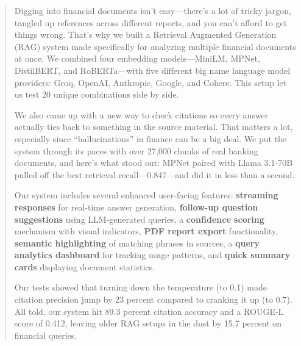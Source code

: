 \documentclass[runningheads]{llncs}
\begin{document}
\begin{abstract}
Digging into financial documents isn't easy---there's a lot of tricky jargon, tangled up references across different reports, and you can't afford to get things wrong. That's why we built a Retrieval Augmented Generation (RAG) system made specifically for analyzing multiple financial documents at once. We combined four embedding models---MiniLM, MPNet, DistilBERT, and RoBERTa---with five different big name language model providers: Groq, OpenAI, Anthropic, Google, and Cohere. This setup let us test 20 unique combinations side by side.

We also came up with a new way to check citations so every answer actually ties back to something in the source material. That matters a lot, especially since ``hallucinations'' in finance can be a big deal. We put the system through its paces with over 27,000 chunks of real banking documents, and here's what stood out: MPNet paired with Llama 3.1-70B pulled off the best retrieval recall---0.847---and did it in less than a second.

Our system includes several enhanced user-facing features: \textbf{streaming responses} for real-time answer generation, \textbf{follow-up question suggestions} using LLM-generated queries, a \textbf{confidence scoring} mechanism with visual indicators, \textbf{PDF report export} functionality, \textbf{semantic highlighting} of matching phrases in sources, a \textbf{query analytics dashboard} for tracking usage patterns, and \textbf{quick summary cards} displaying document statistics.

Our tests showed that turning down the temperature (to 0.1) made citation precision jump by 23 percent compared to cranking it up (to 0.7). All told, our system hit 89.3 percent citation accuracy and a ROUGE-L score of 0.412, leaving older RAG setups in the dust by 15.7 percent on financial queries.

\end{abstract}

\end{document}
